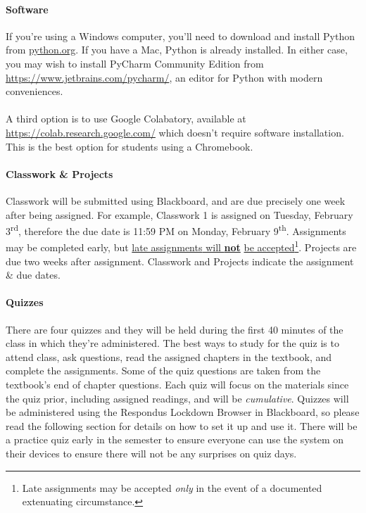 \documentclass[letter,10pt]{article}
\begin{document}
\paragraph{Software}If you're using a Windows computer, you'll need to download and install Python from \href{https://www.python.org/downloads/windows/}{python.org}. If you have a Mac, Python is already installed. In either case, you may wish to install PyCharm Community Edition from \url{https://www.jetbrains.com/pycharm/}, an editor for Python with modern conveniences.

\paragraph{}A third option is to use Google Colabatory, available at \url{https://colab.research.google.com/} which doesn't require software installation. This is the best option for students using a Chromebook.

\label{sec:cwhw}
\paragraph{Classwork \& Projects}Classwork will be submitted using Blackboard, and are due precisely one week after being assigned. For example, Classwork 1 is assigned on Tuesday, February 3\textsuperscript{rd}, therefore the due date is 11:59 PM on Monday, February 9\textsuperscript{th}. Assignments may be completed early, but \underline{\hypertarget{sec:cwhw}{late assignments} will \textbf{not}} \underline{be accepted}\footnote{Late assignments may be accepted \textit{only} in the event of a documented extenuating circumstance.}. Projects are due two weeks after assignment. Classwork and Projects indicate the assignment \& due dates.

\paragraph{Quizzes}There are four quizzes and they will be held during the first 40 minutes of the class in which they're administered. The best ways to study for the quiz is to attend class, ask questions, read the assigned chapters in the textbook, and complete the assignments. Some of the quiz questions are taken from the textbook's end of chapter questions. Each quiz will focus on the materials since the quiz prior, including assigned readings, and will be \textit{cumulative}. Quizzes will be administered using the Respondus Lockdown Browser in Blackboard, so please read the following section for details on how to set it up and use it. There will be a practice quiz early in the semester to ensure everyone can use the system on their devices to ensure there will not be any surprises on quiz days.
\end{document}
